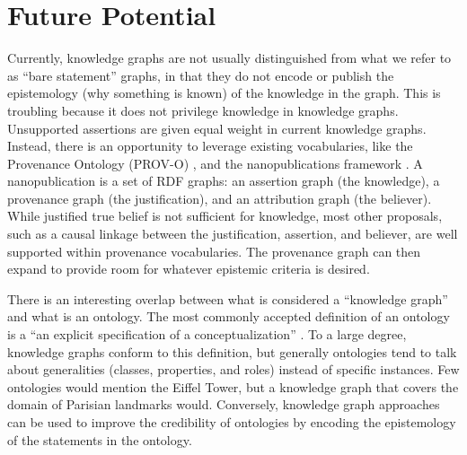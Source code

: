 \section{Future Potential}

Currently, knowledge graphs are not usually distinguished from what we refer to as ``bare statement'' graphs, in that they do not encode or publish the epistemology (why something is known) of the knowledge in the graph.
This is troubling because it does not privilege knowledge in knowledge graphs.
Unsupported assertions are given equal weight in current knowledge graphs.
Instead, there is an opportunity to leverage existing vocabularies, like the Provenance Ontology (PROV-O) \cite{Moreau_2015}, and the nanopublications framework \cite{groth2010anatomy}.
A nanopublication is a set of RDF graphs: an assertion graph (the knowledge), a provenance graph (the justification), and an attribution graph (the believer).
While justified true belief is not sufficient for knowledge, most other proposals, such as a causal linkage between the justification, assertion, and believer, are well supported within provenance vocabularies.
The provenance graph can then expand to provide room for whatever epistemic criteria is desired.

There is an interesting overlap between what is considered a ``knowledge graph'' and what is an ontology.
The most commonly accepted definition of an ontology is a ``an explicit specification of a conceptualization'' \cite{Gruber_1993}.
To a large degree, knowledge graphs conform to this definition, but generally ontologies tend to talk about generalities (classes, properties, and roles) instead of specific instances.
Few ontologies would mention the Eiffel Tower, but a knowledge graph that covers the domain of Parisian landmarks would.
Conversely, knowledge graph approaches can be used to improve the credibility of ontologies by encoding the epistemology of the statements in the ontology.
